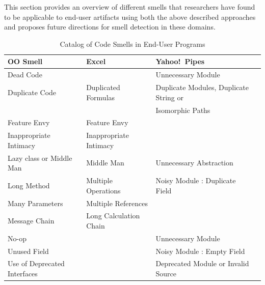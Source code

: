 \documentclass{sig-alternate}
\renewcommand*\cmidrule{\midrule[0.001em]} %
\newcommand{\todo}[1]{\textbf{TODO: #1}}
\begin{document}
This section provides an overview of different smells that researchers have found to be applicable to end-user artifacts using both the above described approaches and proposes future directions for smell detection in these domains. 

\begin{table}
\caption{Catalog of Code Smells in End-User Programs
\label{table:oosmellslarge}}
\centering
\sffamily
\begin{tabular} {@{}llll@{}}
\toprule
\textbf{OO Smell}
	& \textbf{Excel}
	& \textbf{Yahoo!\ Pipes}
\\ \midrule
Dead Code
	& %
	& Unnecessary Module \cite{StoleeTSE2013}
\\ \cmidrule
Duplicate Code
	& Duplicated Formulas \cite{Hermans2012intra}
	& Duplicate Modules, Duplicate String or
\\ %
& 
& Isomorphic Paths \cite{StoleeTSE2013}
\\ \cmidrule
Feature Envy
	& Feature Envy \cite{Hermans2012inter}
	& %
\\ \cmidrule
Inappropriate Intimacy
	& Inappropriate Intimacy \cite{Hermans2012inter}
	& %
\\ \cmidrule
Lazy class or Middle Man
	& Middle Man \cite{Hermans2012inter}
	& Unnecessary Abstraction \cite{StoleeTSE2013}
\\ \cmidrule
Long Method
	& Multiple Operations \cite{Hermans2012intra}
	& Noisy Module : Duplicate Field \cite{StoleeTSE2013}
\\ \cmidrule
Many Parameters
	& Multiple References \cite{Hermans2012intra}
	& 
\\ \cmidrule
Message Chain
	& Long Calculation Chain \cite{Hermans2012intra}
	& 
\\ \cmidrule
No-op
	& %
	& Unnecessary Module \cite{StoleeTSE2013}
\\ \cmidrule
Unused Field
	& %
	& Noisy Module : Empty Field \cite{StoleeTSE2013}
\\ \cmidrule
Use of Deprecated Interfaces
	& %
	& Deprecated Module or Invalid Source \cite{StoleeTSE2013}
\\ \bottomrule
\end{tabular}
\end{table}
\end{document}
